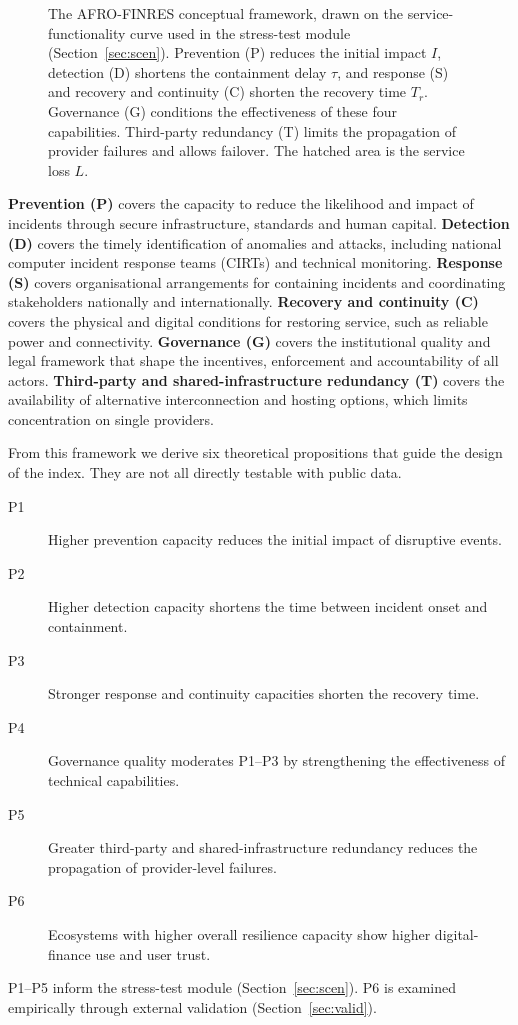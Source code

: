 \documentclass[fintech,article,submit,pdftex,moreauthors]{Definitions/mdpi}
\begin{document}
\begin{figure}[H]
{}
\caption{The AFRO-FINRES conceptual framework, drawn on the service-functionality curve used in the stress-test module (Section~\ref{sec:scen}). Prevention (P) reduces the initial impact $I$, detection (D) shortens the containment delay $\tau$, and response (S) and recovery and continuity (C) shorten the recovery time $T_r$. Governance (G) conditions the effectiveness of these four capabilities. Third-party redundancy (T) limits the propagation of provider failures and allows failover. The hatched area is the service loss $L$.}
\label{fig:framework}
\end{figure}

\textbf{Prevention (P)} covers the capacity to reduce the likelihood and impact of incidents through secure infrastructure, standards and human capital. \textbf{Detection (D)} covers the timely identification of anomalies and attacks, including national computer incident response teams (CIRTs) and technical monitoring. \textbf{Response (S)} covers organisational arrangements for containing incidents and coordinating stakeholders nationally and internationally. \textbf{Recovery and continuity (C)} covers the physical and digital conditions for restoring service, such as reliable power and connectivity. \textbf{Governance (G)} covers the institutional quality and legal framework that shape the incentives, enforcement and accountability of all actors. \textbf{Third-party and shared-infrastructure redundancy (T)} covers the availability of alternative interconnection and hosting options, which limits concentration on single providers.

From this framework we derive six theoretical propositions that guide the design of the index. They are not all directly testable with public data.
\begin{description}
 \item[P1] Higher prevention capacity reduces the initial impact of disruptive events.
 \item[P2] Higher detection capacity shortens the time between incident onset and containment.
 \item[P3] Stronger response and continuity capacities shorten the recovery time.
 \item[P4] Governance quality moderates P1--P3 by strengthening the effectiveness of technical capabilities.
 \item[P5] Greater third-party and shared-infrastructure redundancy reduces the propagation of provider-level failures.
 \item[P6] Ecosystems with higher overall resilience capacity show higher digital-finance use and user trust.
\end{description}
P1--P5 inform the stress-test module (Section~\ref{sec:scen}). P6 is examined empirically through external validation (Section~\ref{sec:valid}).
\end{document}
